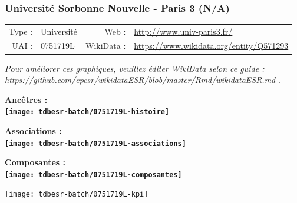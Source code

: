 \documentclass[12pt,french,]{article}
\begin{document}
\ifoddpage \fi ~\newpage  

\hypertarget{universituxe9-sorbonne-nouvelle---paris-3-na}{%
\subsubsection{Université Sorbonne Nouvelle - Paris 3
(N/A)}\label{universituxe9-sorbonne-nouvelle---paris-3-na}}

\begin{tabular*}{\textwidth}{rp{5cm}rl}  
\hline  
Type : & Université & Web : &\href{http://www.univ-paris3.fr/}{http://www.univ-paris3.fr/} \\  
UAI : & 0751719L & WikiData : & \href{https://www.wikidata.org/entity/Q571293}{https://www.wikidata.org/entity/Q571293} \\  
\hline  
\end{tabular*}

\textit{\scriptsize Pour améliorer ces graphiques, veuillez éditer WikiData selon ce guide :  \href{https://github.com/cpesr/wikidataESR/blob/master/Rmd/wikidataESR.md}{https://github.com/cpesr/wikidataESR/blob/master/Rmd/wikidataESR.md}}
.

\vspace{1cm}  
\begin{minipage}[b]{0.50\textwidth}\begin{center} \bf Ancêtres : \\  
\texttt{[image: tdbesr-batch/0751719L-histoire]} \end{center}\end{minipage}\begin{minipage}[b]{0.50\textwidth}\begin{center} \bf Associations : \\  
\texttt{[image: tdbesr-batch/0751719L-associations]} \end{center}\end{minipage}

\hrulefill

\begin{center} \bf Composantes : \\  
\texttt{[image: tdbesr-batch/0751719L-composantes]} \end{center}

\begin{center}\texttt{[image: tdbesr-batch/0751719L-kpi]} \end{center}\checkoddpage

\ifoddpage \fi ~\newpage  
\end{document}
